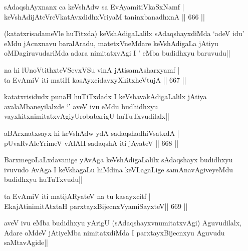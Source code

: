 
\begin{shl}
sAdaqshAyxnanx ca keVshAdw sa EvAyamitiVkaSxNamf | \\
keVshAdijAteVreVkatAvxdidhxVriyaM taninxbanadhxnA \hfill||  666 ||  
\end{shl}

\begin{artha}
(katatxrisadameVle huTitxda) keVshAdigaLalilx sAdaqshayxdiMda `adeV idu' eMdu jAcnxnavu baralAradu, matetxVneMdare keVshAdigaLa jAtiyu oMDagiruvudariMda adara nimitatxvAgi I \stext' eMba budidhxyu baruvudu||
\end{artha}

\begin{shl}
na hi lUnoVtithxteVSevxVSu vinA jAtisamAsharxyamf | \\
ta EvAmiV iti matiH kasAyxcidavxyXkitxheVtujA \hfill||  667 ||  
\end{shl}

\begin{artha}
katatxrisidudx punaH huTiTxdadx I keVshavakAdigaLalilx jAtiya avalaMbaneyilalxde `\stext' aveV ivu eMdu budhidhxyu vayxkitxnimitatxvAgiyUrobabxrigU huTuTxvudilalx||
\end{artha}

\begin{shl}
aBArxnatxsayx hi keVshAdw ydA sadaqshadhiVsatxdA | \\
pUvaRvAleYrimeV vAlAH sadaqshA iti jAyateV \hfill||  668 ||  
\end{shl}

\begin{artha}
BarxmegoLaLxdavanige yAvAga keVshAdigaLalilx sAdaqshayx budidhxyu ivuvudo AvAga I keVshagaLu hiMdina keVLagaLige samAnavAgiveyeMdu budidhxyu huTuTxvudu||
\end{artha}


\begin{shl}
ta EvAmiV iti matijARyateV na tu kasayxcitf | \\
EkajAtinimitAtx\s taH parxtayxBijecnxVyamiSayxteV\hfill ||  669 || 
\end{shl}

\begin{artha}
aveV ivu eMba budidhxyu yArigU (sAdaqshayxvnumitatxvAgi) Aguvudilalx, Adare oMdeV jAtiyeMba nimitatxdiMda I parxtayxBijecnxyu Aguvudu saMtavAgide||
\end{artha}

